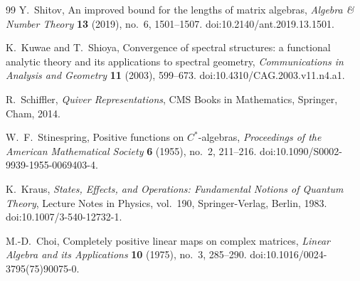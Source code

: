 \documentclass[11pt]{article}
\numberwithin{equation}{section}
\theoremstyle{definition}
\theoremstyle{remark}
\begin{document}
\begin{thebibliography}{99}
Y.~Shitov,
\newblock An improved bound for the lengths of matrix algebras,
\newblock \emph{Algebra \& Number Theory} \textbf{13} (2019), no.~6,
1501--1507.
\newblock doi:10.2140/ant.2019.13.1501.

K.~Kuwae and T.~Shioya,
\newblock Convergence of spectral structures: a functional analytic theory and
its applications to spectral geometry,
\newblock \emph{Communications in Analysis and Geometry} \textbf{11} (2003),
599--673.
\newblock doi:10.4310/CAG.2003.v11.n4.a1.

R.~Schiffler,
\newblock \emph{Quiver Representations},
\newblock CMS Books in Mathematics, Springer, Cham, 2014.

W.~F.~Stinespring,
\newblock Positive functions on $C^*$-algebras,
\newblock \emph{Proceedings of the American Mathematical Society} \textbf{6}
(1955), no.~2, 211--216.
\newblock doi:10.1090/S0002-9939-1955-0069403-4.

K.~Kraus,
\newblock \emph{States, Effects, and Operations: Fundamental Notions of Quantum
Theory},
\newblock Lecture Notes in Physics, vol.~190, Springer-Verlag, Berlin, 1983.
\newblock doi:10.1007/3-540-12732-1.

M.-D.~Choi,
\newblock Completely positive linear maps on complex matrices,
\newblock \emph{Linear Algebra and its Applications} \textbf{10} (1975),
no.~3, 285--290.
\newblock doi:10.1016/0024-3795(75)90075-0.

\end{thebibliography}
\end{document}
